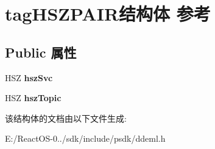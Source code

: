\hypertarget{structtag_h_s_z_p_a_i_r}{}\section{tag\+H\+S\+Z\+P\+A\+I\+R结构体 参考}
\label{structtag_h_s_z_p_a_i_r}
\subsection*{Public 属性}
\begin{DoxyCompactItemize}
\item 
\mbox{\label{structtag_h_s_z_p_a_i_r_a44814bf2ccd76b65fceafbad2d6d03eb}} 
H\+SZ {\bfseries hsz\+Svc}
\item 
\mbox{\label{structtag_h_s_z_p_a_i_r_a5ab24f108ea7ae8dca751709a59060d1}} 
H\+SZ {\bfseries hsz\+Topic}
\end{DoxyCompactItemize}


该结构体的文档由以下文件生成\+:\begin{DoxyCompactItemize}
\item 
E\+:/\+React\+O\+S-\/0../sdk/include/psdk/ddeml.\+h\end{DoxyCompactItemize}
